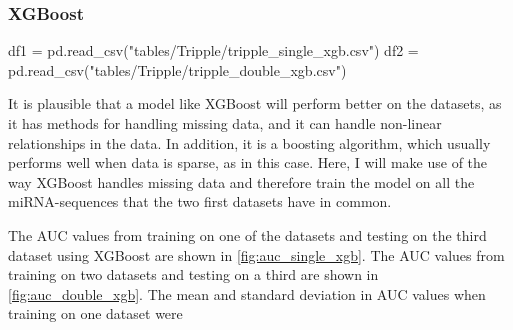 {{{{{{\subsubsection{XGBoost}
\begin{pycode}
df1 = pd.read_csv("tables/Tripple/tripple_single_xgb.csv")
df2 = pd.read_csv("tables/Tripple/tripple_double_xgb.csv")
\end{pycode}
It is plausible that a model like XGBoost will perform better on the datasets, as it has methods for handling missing data, and it can handle non-linear relationships in the data. In addition, it is a boosting algorithm, which usually performs well when data is sparse, as in this case. Here, I will make use of the way XGBoost handles missing data and therefore train the model on all the miRNA-sequences that the two first datasets have in common.

The AUC values from training on one of the datasets and testing on the third dataset using XGBoost are shown in \autoref{fig:auc_single_xgb}. The AUC values from training on two datasets and testing on a third are shown in \autoref{fig:auc_double_xgb}. The mean and standard deviation in AUC values when training on one dataset were \py{"$%

}}}}}}}
